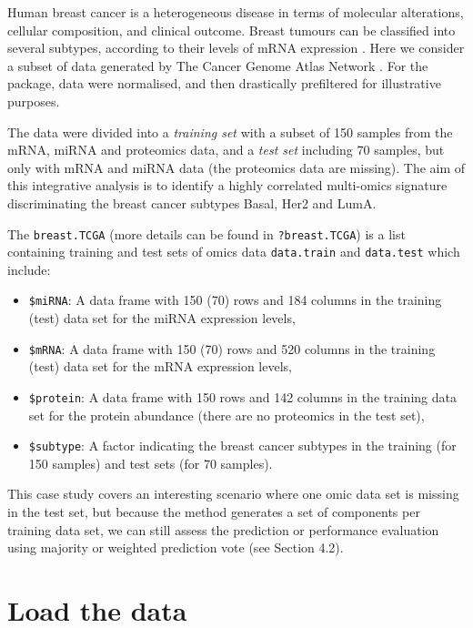 \documentclass[]{book}
\providecommand{\tightlist}{%
  \setlength{\itemsep}{0pt}\setlength{\parskip}{0pt}}
\begin{document}
Human breast cancer is a heterogeneous disease in terms of molecular alterations, cellular composition, and clinical outcome. Breast tumours can be classified into several subtypes, according to their levels of mRNA expression \citep{Sor01}. Here we consider a subset of data generated by The Cancer Genome Atlas Network \citep{TCGA12}. For the package, data were normalised, and then drastically prefiltered for illustrative purposes.

The data were divided into a \emph{training set} with a subset of 150 samples from the mRNA, miRNA and proteomics data, and a \emph{test set} including 70 samples, but only with mRNA and miRNA data (the proteomics data are missing). The aim of this integrative analysis is to identify a highly correlated multi-omics signature discriminating the breast cancer subtypes Basal, Her2 and LumA.

The \texttt{breast.TCGA} (more details can be found in \texttt{?breast.TCGA}) is a list containing training and test sets of omics data \texttt{data.train} and \texttt{data.test} which include:

\begin{itemize}
\tightlist
\item
  \texttt{\$miRNA}: A data frame with 150 (70) rows and 184 columns in the training (test) data set for the miRNA expression levels,
\item
  \texttt{\$mRNA}: A data frame with 150 (70) rows and 520 columns in the training (test) data set for the mRNA expression levels,
\item
  \texttt{\$protein}: A data frame with 150 rows and 142 columns in the training data set for the protein abundance (there are no proteomics in the test set),
\item
  \texttt{\$subtype}: A factor indicating the breast cancer subtypes in the training (for 150 samples) and test sets (for 70 samples).
\end{itemize}

This case study covers an interesting scenario where one omic data set is missing in the test set, but because the method generates a set of components per training data set, we can still assess the prediction or performance evaluation using majority or weighted prediction vote (see Section 4.2).

\hypertarget{diablo:load}{%
\section{Load the data}\label{diablo:load}}
\end{document}
